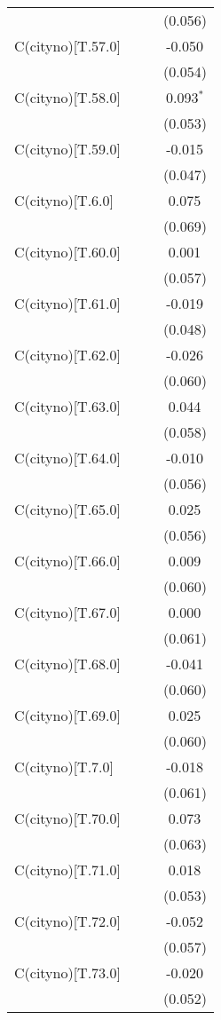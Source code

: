 \begin{table}[!htbp]
\begin{tabular}{@{\extracolsep{5pt}}lccc}
& & & (0.056) \\
 C(cityno)[T.57.0] & & & -0.050$^{}$ \\
& & & (0.054) \\
 C(cityno)[T.58.0] & & & 0.093$^{*}$ \\
& & & (0.053) \\
 C(cityno)[T.59.0] & & & -0.015$^{}$ \\
& & & (0.047) \\
 C(cityno)[T.6.0] & & & 0.075$^{}$ \\
& & & (0.069) \\
 C(cityno)[T.60.0] & & & 0.001$^{}$ \\
& & & (0.057) \\
 C(cityno)[T.61.0] & & & -0.019$^{}$ \\
& & & (0.048) \\
 C(cityno)[T.62.0] & & & -0.026$^{}$ \\
& & & (0.060) \\
 C(cityno)[T.63.0] & & & 0.044$^{}$ \\
& & & (0.058) \\
 C(cityno)[T.64.0] & & & -0.010$^{}$ \\
& & & (0.056) \\
 C(cityno)[T.65.0] & & & 0.025$^{}$ \\
& & & (0.056) \\
 C(cityno)[T.66.0] & & & 0.009$^{}$ \\
& & & (0.060) \\
 C(cityno)[T.67.0] & & & 0.000$^{}$ \\
& & & (0.061) \\
 C(cityno)[T.68.0] & & & -0.041$^{}$ \\
& & & (0.060) \\
 C(cityno)[T.69.0] & & & 0.025$^{}$ \\
& & & (0.060) \\
 C(cityno)[T.7.0] & & & -0.018$^{}$ \\
& & & (0.061) \\
 C(cityno)[T.70.0] & & & 0.073$^{}$ \\
& & & (0.063) \\
 C(cityno)[T.71.0] & & & 0.018$^{}$ \\
& & & (0.053) \\
 C(cityno)[T.72.0] & & & -0.052$^{}$ \\
& & & (0.057) \\
 C(cityno)[T.73.0] & & & -0.020$^{}$ \\
& & & (0.052) \\

\end{tabular}
\end{table}
